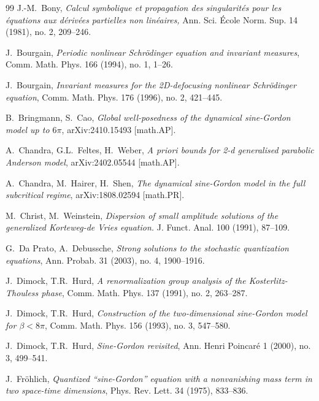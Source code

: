 \documentclass[letterpaper, 11pt,  reqno]{amsart}
\theoremstyle{myremark}
\newcommand{\1}{\hspace{0.5mm}\text{I}\hspace{0.5mm}}
\newcommand{\be}{\beta}
\numberwithin{equation}{section}
\numberwithin{theorem}{section}
\begin{document}
\begin{thebibliography}{99}
J.-M.~Bony, 
{\it Calcul symbolique et propagation des singularit\'es pour les \'equations aux d\'eriv\'ees partielles non lin\'eaires,}
Ann. Sci. \'Ecole Norm. Sup.  14 (1981), no. 2, 209--246.


J.~Bourgain,
{\it Periodic nonlinear Schr\"odinger equation and invariant measures},
Comm. Math. Phys. 166 (1994), no. 1, 1--26.


J.~Bourgain, 
{\it Invariant measures for the 2D-defocusing nonlinear Schr\"odinger equation}, 
Comm. Math. Phys. 176 (1996), no. 2, 421--445. 



B.~Bringmann, S.~Cao,
{\it 
Global well-posedness of the dynamical sine-Gordon model up to $6\pi$}, 
arXiv:2410.15493 [math.AP].




A.~Chandra, G.L.~Feltes, H.~Weber,
{\it A priori bounds for 2-d generalised parabolic Anderson model},
arXiv:2402.05544 [math.AP].

A.~Chandra, M.~Hairer, H.~Shen,
{\it The dynamical sine-Gordon model in the full subcritical regime},
arXiv:1808.02594 [math.PR].


M.~Christ, M.~Weinstein,
{\it Dispersion of small amplitude solutions of the generalized Korteweg-de Vries equation.}
J. Funct. Anal.
100 (1991), 87--109.





G.~Da Prato, A.~Debussche, 
{\it Strong solutions to the stochastic quantization equations}, 
Ann. Probab. 31 (2003), no. 4, 1900--1916.



J.~Dimock, T.R.~Hurd,
{\it A renormalization group analysis of the Kosterlitz-Thouless phase},
Comm. Math. Phys. 137 (1991), no. 2, 263--287.

J.~Dimock, T.R.~Hurd,
{\it Construction of the two-dimensional sine-Gordon model for $\be < 8\pi$},
Comm. Math. Phys. 156 (1993), no. 3, 547--580.

J.~Dimock, T.R.~Hurd,
{\it Sine-Gordon revisited},
Ann. Henri Poincar\'e 1 (2000), no. 3, 499--541.



J.~Fr\"ohlich, 
{\it Quantized ``sine-Gordon'' equation with a nonvanishing mass term in two space-time dimensions},
 Phys. Rev. Lett. 34 (1975), 833--836. 


\end{thebibliography}
\end{document}
